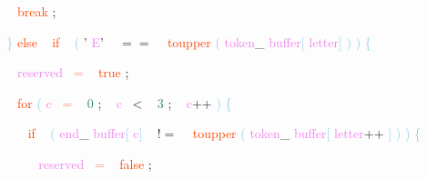 \documentclass[8, usernames, dvipsnames]{beamer}
\begin{document}
\begin{frame}
\textcolor{White}{\   }
\textcolor{White}{\   }
\textcolor{White}{\   }
\textcolor{OrangeRed}{break}
\textcolor{Sepia}{;}

 \textcolor{White}{\   }
\textcolor{White}{\   }
\textcolor{SkyBlue}{\} }
\textcolor{OrangeRed}{else}
\textcolor{White}{\ }
\textcolor{OrangeRed}{if}
\textcolor{White}{\ }
\textcolor{SkyBlue}{(}
\textcolor{BurntOrange}{'}
\textcolor{Violet}{E}\textcolor{BurntOrange}{'}
\textcolor{White}{\ }
\textcolor{OliveGreen}{$==$}
\textcolor{White}{\ }
\textcolor{OrangeRed}{toupper}
\textcolor{SkyBlue}{(}
\textcolor{Violet}{token}\textcolor{Sepia}{\_}
\textcolor{Violet}{buffer}\textcolor{SkyBlue}{[}
\textcolor{Violet}{letter}\textcolor{SkyBlue}{]}
\textcolor{SkyBlue}{)}
\textcolor{SkyBlue}{)}
\textcolor{SkyBlue}{\{ }

 \textcolor{White}{\   }
\textcolor{White}{\   }
\textcolor{White}{\   }
\textcolor{Violet}{reserved}\textcolor{White}{\ }
\textcolor{Salmon}{=}
\textcolor{White}{\ }
\textcolor{OrangeRed}{true}
\textcolor{Sepia}{;}

 \textcolor{White}{\   }
\textcolor{White}{\   }
\textcolor{White}{\   }
\textcolor{OrangeRed}{for}
\textcolor{SkyBlue}{(}
\textcolor{Violet}{c}\textcolor{White}{\ }
\textcolor{Salmon}{=}
\textcolor{White}{\ }
\textcolor{SeaGreen}{0}
\textcolor{Sepia}{;}
\textcolor{White}{\ }
\textcolor{Violet}{c}\textcolor{White}{\ }
\textcolor{OliveGreen}{\textless}
\textcolor{White}{\ }
\textcolor{SeaGreen}{3}
\textcolor{Sepia}{;}
\textcolor{White}{\ }
\textcolor{Violet}{c}\textcolor{Apricot}{++}
\textcolor{SkyBlue}{)}
\textcolor{SkyBlue}{\{ }

 \textcolor{White}{\   }
\textcolor{White}{\   }
\textcolor{White}{\   }
\textcolor{White}{\   }
\textcolor{OrangeRed}{if}
\textcolor{White}{\ }
\textcolor{SkyBlue}{(}
\textcolor{Violet}{end}\textcolor{Sepia}{\_}
\textcolor{Violet}{buffer}\textcolor{SkyBlue}{[}
\textcolor{Violet}{c}\textcolor{SkyBlue}{]}
\textcolor{White}{\ }
\textcolor{OliveGreen}{$!=$}
\textcolor{White}{\ }
\textcolor{OrangeRed}{toupper}
\textcolor{SkyBlue}{(}
\textcolor{Violet}{token}\textcolor{Sepia}{\_}
\textcolor{Violet}{buffer}\textcolor{SkyBlue}{[}
\textcolor{Violet}{letter}\textcolor{Apricot}{++}
\textcolor{SkyBlue}{]}
\textcolor{SkyBlue}{)}
\textcolor{SkyBlue}{)}
\textcolor{SkyBlue}{\{ }

 \textcolor{White}{\   }
\textcolor{White}{\   }
\textcolor{White}{\   }
\textcolor{White}{\   }
\textcolor{White}{\   }
\textcolor{Violet}{reserved}\textcolor{White}{\ }
\textcolor{Salmon}{=}
\textcolor{White}{\ }
\textcolor{OrangeRed}{false}
\textcolor{Sepia}{;}


\end{frame}
\end{document}
